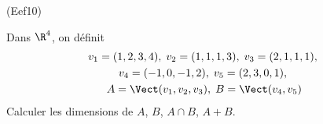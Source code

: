 \begin{tiny}(Eef10)\end{tiny} Dans $\R^4$, on définit
\begin{multline*}
  v_1=(1,2,3,4),\; v_2=(1,1,1,3),\; v_3=(2,1,1,1),\;\\
  v_4=(-1,0,-1,2),\;
  v_5=(2,3,0,1),\;\\
  A = \Vect(v_1,v_2,v_3),\; B = \Vect(v_4,v_5)
\end{multline*}
Calculer les dimensions de $A$, $B$, $A\cap B$, $A+B$.